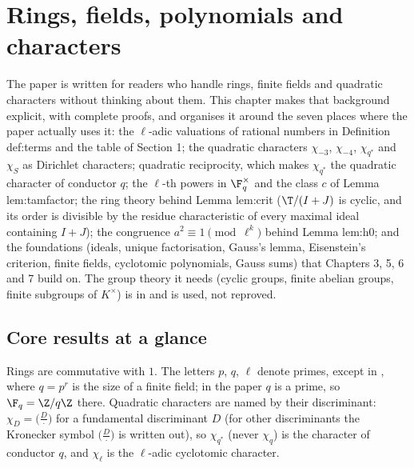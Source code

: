 \chapter{Rings, fields, polynomials and characters}\label{ch:rings}

The paper is written for readers who handle rings, finite fields and quadratic characters without
thinking about them. This chapter makes that background explicit, with complete proofs, and organises it
around the seven places where the paper actually uses it: the $\ell$-adic valuations of rational numbers
in Definition def:terms and the table of Section 1; the quadratic characters $\chi_{-3}$, $\chi_{-4}$,
$\chi_{q^*}$ and $\chi_S$ as Dirichlet characters; quadratic reciprocity, which makes $\chi_{q^*}$ the
quadratic character of conductor $q$; the $\ell$-th powers in $\F_q^\times$ and the class $c$ of Lemma
lem:tamfactor; the ring theory behind Lemma lem:crit ($\T/(I+J)$ is cyclic, and its order is divisible by
the residue characteristic of every maximal ideal containing $I+J$); the congruence $a^2\equiv1\pmod{\ell^k}$
behind Lemma lem:h0; and the foundations (ideals, unique factorisation, Gauss's lemma, Eisenstein's
criterion, finite fields, cyclotomic polynomials, Gauss sums) that Chapters 3, 5, 6 and 7 build on. The
group theory it needs (cyclic groups, finite abelian groups, finite subgroups of $K^\times$) is in
 and is used, not reproved.

\section*{Core results at a glance}

Rings are commutative with $1$. The letters $p$, $q$, $\ell$ denote primes, except in
, where $q=p^r$ is the size of a finite field; in the paper
$q$ is a prime, so $\F_q=\Z/q\Z$ there. Quadratic characters are named by their discriminant:
$\chi_D=\bigl(\frac D\cdot\bigr)$ for a fundamental discriminant $D$ (for other discriminants the Kronecker symbol
$\bigl(\frac D\cdot\bigr)$ is written out), so $\chi_{q^*}$ (never $\chi_q$) is the character of conductor $q$, and
$\chi_\ell$ is the $\ell$-adic cyclotomic character.

